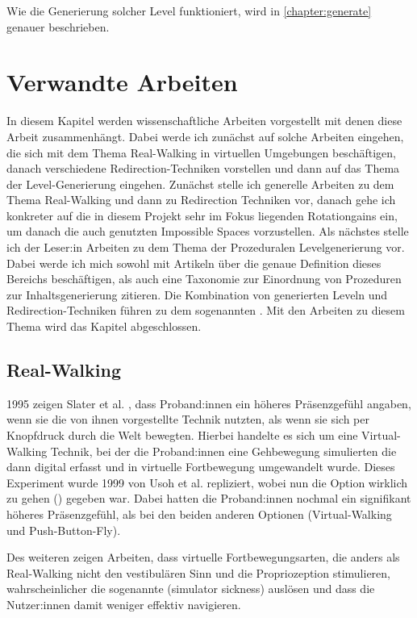 Wie die Generierung solcher Level funktioniert, wird in \autoref{chapter:generate} genauer beschrieben.

\chapter{Verwandte Arbeiten}\label{chapter:relatedwork}

In diesem Kapitel werden wissenschaftliche Arbeiten vorgestellt mit denen diese Arbeit zusammenhängt. Dabei werde ich zunächst auf solche Arbeiten eingehen, die sich mit dem Thema Real-Walking in virtuellen Umgebungen beschäftigen, danach verschiedene Redirection-Techniken vorstellen und dann auf das Thema der Level-Generierung eingehen. Zunächst stelle ich generelle Arbeiten zu dem Thema Real-Walking und dann zu Redirection Techniken vor, danach gehe ich konkreter auf die in diesem Projekt sehr im Fokus liegenden Rotationgains ein, um danach die auch genutzten Impossible Spaces vorzustellen. Als nächstes stelle ich der Leser:in Arbeiten zu dem Thema der Prozeduralen Levelgenerierung vor. Dabei werde ich mich sowohl mit Artikeln über die genaue Definition dieses Bereichs beschäftigen, als auch eine Taxonomie zur Einordnung von Prozeduren zur Inhaltsgenerierung zitieren. Die Kombination von generierten Leveln und Redirection-Techniken führen zu dem sogenannten . Mit den Arbeiten zu diesem Thema wird das Kapitel abgeschlossen.

\section{Real-Walking}
1995 zeigen Slater et al. \cite{taking-steps}, dass Proband:innen ein höheres Präsenzgefühl angaben, wenn sie die von ihnen vorgestellte Technik  nutzten, als wenn sie sich per Knopfdruck durch die Welt bewegten. Hierbei handelte es sich um eine Virtual-Walking Technik, bei der die Proband:innen eine Gehbewegung simulierten die dann digital erfasst und in virtuelle Fortbewegung umgewandelt wurde. Dieses Experiment wurde 1999 von Usoh et al. \cite{usoh-vergleich-1999} repliziert, wobei nun die Option wirklich zu gehen () gegeben war. Dabei hatten die Proband:innen nochmal ein signifikant höheres Präsenzgefühl, als bei den beiden anderen Optionen (Virtual-Walking und Push-Button-Fly).

Des weiteren zeigen Arbeiten, dass virtuelle Fortbewegungsarten, die anders
als Real-Walking nicht den vestibulären Sinn und die Propriozeption stimulieren, wahrscheinlicher die sogenannte  (simulator sickness) auslösen \cite{locomotion-path-integration} und dass die Nutzer:innen damit weniger effektiv navigieren. \cite{benefits-real-walking}

